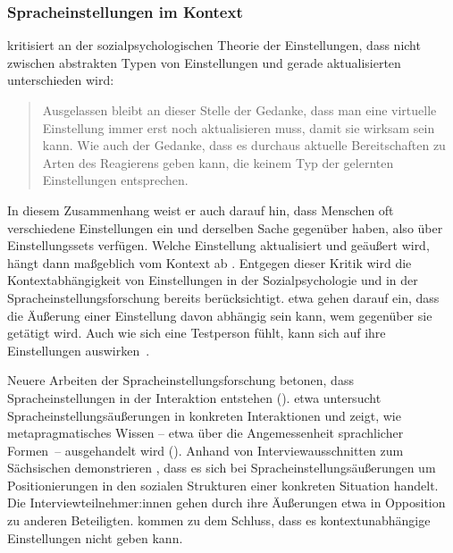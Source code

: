 \subsubsection{Spracheinstellungen im Kontext}
\label{sec:Interaktion}
\citet[72--73]{Hermanns.2002} kritisiert an der sozialpsychologischen Theorie der Einstellungen, dass nicht zwischen abstrakten Typen von Einstellungen und gerade aktualisierten unterschieden wird:
\begin{quote}Ausgelassen bleibt an dieser Stelle der Gedanke, dass man eine virtuelle Einstellung immer erst noch aktualisieren muss, damit sie wirksam sein kann. Wie auch der Gedanke, dass es durchaus aktuelle Bereitschaften zu Arten des Reagierens geben kann, die keinem Typ der gelernten Einstellungen entsprechen.~\citep[73]{Hermanns.2002}\end{quote}
In diesem Zusammenhang weist er auch darauf hin, dass Menschen oft verschiedene Einstellungen ein und derselben Sache gegen{\"u}ber haben, also {\"u}ber Einstellungssets verf{\"u}gen. 
Welche Einstellung aktualisiert %
und geäußert %
wird, h{\"a}ngt dann ma{\ss}geblich vom Kontext ab \citep[73--74]{Hermanns.2002}. 
Entgegen dieser Kritik wird die Kontextabhängigkeit von Einstellungen in der Sozialpsychologie und in der Spracheinstellungsforschung bereits berücksichtigt. 
\citet[210--211]{Jonas.2014} etwa gehen darauf ein, dass die Äußerung einer Einstellung davon abhängig sein kann, wem gegenüber sie getätigt wird. 
Auch wie sich eine Testperson f{\"u}hlt, kann sich auf ihre Einstellungen auswirken~\citep[s.][218]{Cargile.1994}. 

Neuere Arbeiten der Spracheinstellungsforschung betonen, dass Spracheinstellungen in der Interaktion entstehen (\cites[s.][205--206]{Tophinke.2006}[200]{Liebscher.2009}[5--6]{Konig.2014}). \citet{Konig.2014} etwa untersucht Spracheinstellungsäußerungen in konkreten Interaktionen und zeigt, wie metapragmatisches Wissen -- etwa über die Angemessenheit sprachlicher Formen~-- ausgehandelt wird (\cites[s. auch][200]{Konig2015}{Konig.2017}). 
Anhand von Interviewausschnitten zum Sächsischen demonstrieren \citet[206--207]{Liebscher.2009}, dass es sich bei %
Spracheinstellungsäußerungen %
um Positionierungen in den sozialen Strukturen einer konkreten Situation handelt. 
Die Interviewteilnehmer:innen gehen durch ihre Äußerungen etwa in Opposition zu anderen Beteiligten. 
\citet[218]{Liebscher.2009} kommen zu dem Schluss, dass es kontextunabhängige Einstellungen nicht geben kann. 

